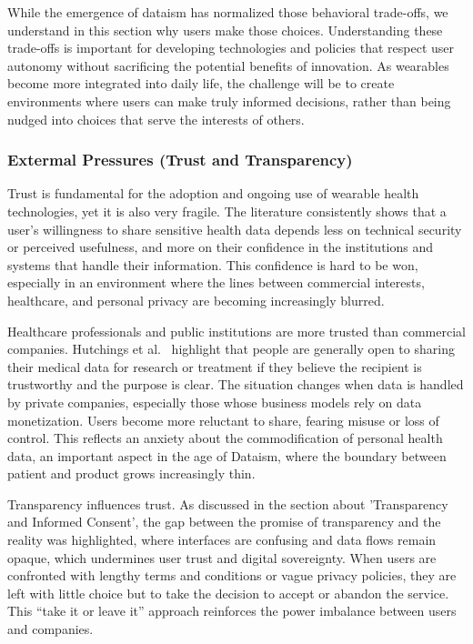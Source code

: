 	While the emergence of dataism has normalized those behavioral trade-offs, we understand in this section why users make those choices. Understanding these trade-offs is important for developing technologies and policies that respect user autonomy without sacrificing the potential benefits of innovation. As wearables become more integrated into daily life, the challenge will be to create environments where users can make truly informed decisions, rather than being nudged into choices that serve the interests of others.
	\subsubsection{Extermal Pressures (Trust and Transparency)}

	Trust is fundamental for the adoption and ongoing use of wearable health technologies, yet it is also very fragile. The literature consistently shows that a user’s willingness to share sensitive health data depends less on technical security or perceived usefulness, and more on their confidence in the institutions and systems that handle their information. This confidence is hard to be won, especially in an environment where the lines between commercial interests, healthcare, and personal privacy are becoming increasingly blurred.

	Healthcare professionals and public institutions are more trusted than commercial companies. Hutchings et al.~\cite{Hutchings2020} highlight that people are generally open to sharing their medical data for research or treatment if they believe the recipient is trustworthy and the purpose is clear. The situation changes  when data is handled by private companies, especially those whose business models rely on data monetization. Users become more reluctant to share, fearing misuse or loss of control. This reflects an anxiety about the commodification of personal health data, an important aspect in the age of Dataism, where the boundary between patient and product grows increasingly thin.

	Transparency influences trust. As discussed in the section about 'Transparency and Informed Consent', the gap between the promise of transparency and the reality was highlighted, where interfaces are confusing and data flows remain opaque, which undermines user trust and digital sovereignty. When users are confronted with lengthy terms and conditions or vague privacy policies, they are left with little choice but to take the decision to accept or abandon the service. This “take it or leave it” approach reinforces the power imbalance between users and companies.

